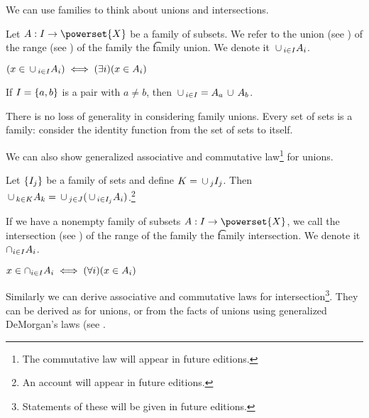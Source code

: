 

We can use families to think about unions and intersections.


Let $A: I \to \powerset{X}$ be a family of subsets.
We refer to the union (see ) of the range (see ) of the family the \t{family union}.
We denote it $\,\cup\,_{i \in I} A_i$.

\begin{proposition}
$(x \in \,\cup\,_{i \in I} A_i) \iff (\exists i)(x \in A_i)$
\end{proposition}

If $I = \{a, b\}$ is a pair with $a \neq b$, then $\,\cup\,_{i \in I} = A_a \,\cup\, A_b$.

There is no loss of generality in considering family unions.
Every set of sets is a family: consider the identity function from the set of sets to itself.

We can also show generalized associative and commutative law\footnote{The commutative law will appear in future editions.} for unions.

\begin{proposition}

Let $\{I_j\}$ be a family of sets and define $K = \,\cup\,_{j} I_j$. Then
$\,\cup\,_{k \in K} A_k = \,\cup\,_{j \in J}(\,\cup\,_{i \in I_j} A_i)$.\footnote{An account will appear in future editions.}

\end{proposition}


If we have a nonempty family of subsets $A: I \to \powerset{X}$, we call the intersection (see ) of the range of the family the \t{family intersection}.
We denote it $\cap_{i \in I} A_i$.

\begin{proposition}
  $x \in \cap_{i \in I} A_i \iff (\forall i)(x \in A_i)$
\end{proposition}

Similarly we can derive associative and commutative laws for intersection\footnote{Statements of these will be given in future editions.}.
They can be derived as for unions, or from the facts of unions using generalized DeMorgan's laws (see .

